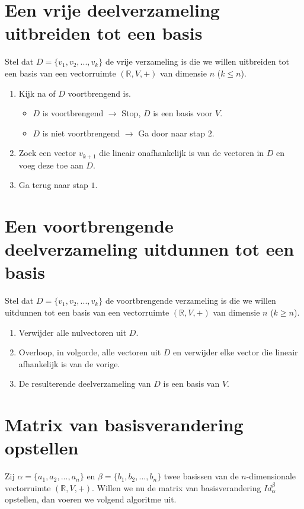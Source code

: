 \documentclass[lineaire_algebra_oplossingen.tex]{subfiles}
\begin{document}
\section{Een vrije deelverzameling uitbreiden tot een basis}
Stel dat $D = \{v_1,v_2,...,v_k\}$ de vrije verzameling is die we willen uitbreiden tot een basis van een vectorruimte $(\mathbb{R},V,+)$ van dimensie $n$ ($k\le n$).
\begin{enumerate}
\item Kijk na of $D$ voortbrengend is.
\begin{itemize}
\item $D$ is voortbrengend $\rightarrow$ Stop, $D$ is een  basis voor $V$.
\item $D$ is niet voortbrengend $\rightarrow$ Ga door naar stap $2$.
\end{itemize}
\item Zoek een vector $v_{k+1}$ die lineair onafhankelijk is van de vectoren in $D$ en voeg deze toe aan $D$.
\item Ga terug naar stap $1$.
\end{enumerate}
\section{Een voortbrengende deelverzameling uitdunnen tot een basis}
Stel dat $D = \{v_1,v_2,...,v_k\}$ de voortbrengende verzameling is die we willen uitdunnen tot een basis van een vectorruimte $(\mathbb{R},V,+)$ van dimensie $n$ ($k\ge n$).
\begin{enumerate}
\item Verwijder alle nulvectoren uit $D$.
\item Overloop, in volgorde, alle vectoren uit $D$ en verwijder elke vector die lineair afhankelijk is van de vorige.
\item De resulterende deelverzameling van $D$ is een basis van $V$.
\end{enumerate}

\section{Matrix van basisverandering opstellen}
Zij $\alpha = \{a_1,a_2,...,a_n\}$ en $\beta = \{b_1,b_2,...,b_n\}$ twee basissen van de $n$-dimensionale vectorruimte $(\mathbb{R},V,+)$. Willen we nu de matrix van basisverandering $Id_\alpha^\beta$ opstellen, dan voeren we volgend algoritme uit.
\end{document}
